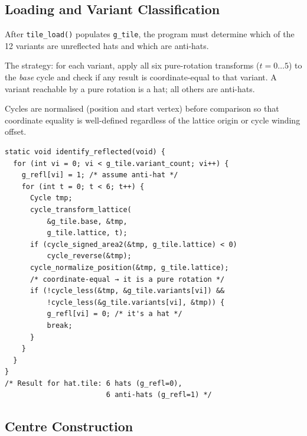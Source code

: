 \documentclass[10pt,a4paper]{article}
\let\polysubsection\subsection
\renewcommand\subsection{\needspace{0.12\textheight}\polysubsection}
\newcommand{\code}[1]{\texttt{\small #1}}
\begin{document}
\subsection{Loading and Variant Classification}

\begin{tcolorbox}[dualbox, title={Chirality Identification — \code{identify\_reflected()}}]
  After \code{tile\_load()} populates \code{g\_tile}, the program must
  determine which of the 12 variants are unreflected hats and which are
  anti-hats.

  The strategy: for each variant, apply all six pure-rotation transforms
  ($t = 0\ldots 5$) to the \emph{base} cycle and check if any result is
  coordinate-equal to that variant.  A variant reachable by a pure
  rotation is a hat; all others are anti-hats.

  Cycles are normalised (position and start vertex) before comparison so
  that coordinate equality is well-defined regardless of the lattice
  origin or cycle winding offset.
\tcblower
\begin{verbatim}
static void identify_reflected(void) {
  for (int vi = 0; vi < g_tile.variant_count; vi++) {
    g_refl[vi] = 1; /* assume anti-hat */
    for (int t = 0; t < 6; t++) {
      Cycle tmp;
      cycle_transform_lattice(
          &g_tile.base, &tmp,
          g_tile.lattice, t);
      if (cycle_signed_area2(&tmp, g_tile.lattice) < 0)
          cycle_reverse(&tmp);
      cycle_normalize_position(&tmp, g_tile.lattice);
      /* coordinate-equal → it is a pure rotation */
      if (!cycle_less(&tmp, &g_tile.variants[vi]) &&
          !cycle_less(&g_tile.variants[vi], &tmp)) {
          g_refl[vi] = 0; /* it's a hat */
          break;
      }
    }
  }
}
/* Result for hat.tile: 6 hats (g_refl=0),
                        6 anti-hats (g_refl=1) */
\end{verbatim}
\end{tcolorbox}

\subsection{Centre Construction}
\end{document}
